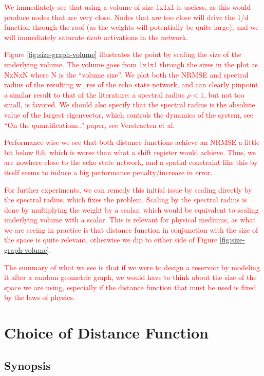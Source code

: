 \textcolor{red}{
  We immediately see that using a volume of size 1x1x1 is useless, as this would
produce nodes that are very close. Nodes that are too close will drive the 1/d
function through the roof (as the weights will potentially be quite large), and
we will immediately saturate $tanh$ activations in the network.
}

\textcolor{red}{
  Figure \ref{fig:size-graph-volume} illustrates the point by scaling the size
of the underlying volume. The volume goes from 1x1x1 through the sizes in the
plot as NxNxN where N is the ``volume size''. We plot both the NRMSE and
spectral radius of the resulting w_res of the echo state network, and can
clearly pinpoint a similar result to that of the literature: a spectral radius
$\rho < 1$, but not too small, is favored. We should also specify that the
spectral radius is the absolute value of the largest eigenvector, which controls
the dynamics of the system, see ``On the quantifications..'' paper, see
Verstraeten et al.
}

\textcolor{red}{
  Performance-wise we see that both distance functions achieve an NRMSE a little
bit below 0.6, which is worse than what a shift register would achieve. Thus, we
are nowhere close to the echo state network, and a spatial constraint like this
by itself seems to induce a big performance penalty/increase in error.
}

\textcolor{red}{
  For further experiments, we can remedy this initial issue by scaling directly
by the spectral radius, which fixes the problem. Scaling by the spectral radius
is done by multiplying the weight by a scalar, which would be equivalent to
scaling underlying volume with a scalar. This is relevant for physical mediums,
as what we are seeing in practice is that distance function in conjunction with
the size of the space is quite relevant, otherwise we dip to either side of
Figure \ref{fig:size-graph-volume}.
}

\textcolor{red}{
  The summary of what we see is that if we were to design a reservoir by
modeling it after a random geometric graph, we would have to think about the
size of the space we are using, especially if the distance function that must be
used is fixed by the laws of physics.
}

\section{Choice of Distance Function}

\subsection{Synopsis}

